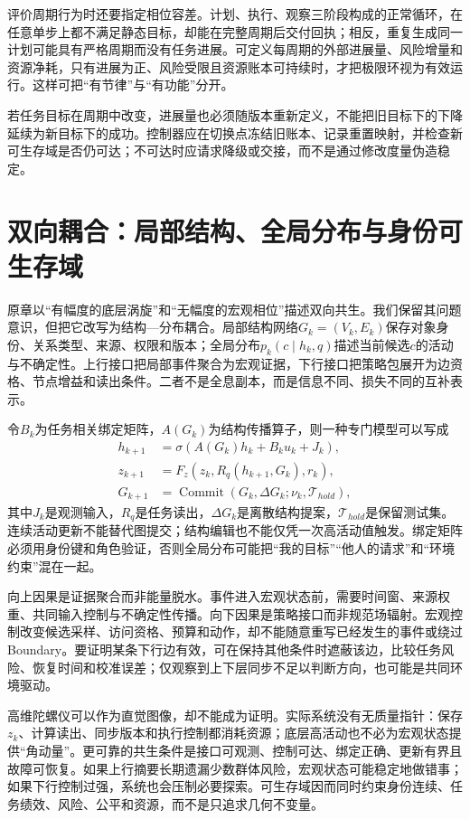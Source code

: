 评价周期行为时还要指定相位容差。计划、执行、观察三阶段构成的正常循环，在任意单步上都不满足静态目标，却能在完整周期后交付回执；相反，重复生成同一计划可能具有严格周期而没有任务进展。可定义每周期的外部进展量、风险增量和资源净耗，只有进展为正、风险受限且资源账本可持续时，才把极限环视为有效运行。这样可把“有节律”与“有功能”分开。

若任务目标在周期中改变，进展量也必须随版本重新定义，不能把旧目标下的下降延续为新目标下的成功。控制器应在切换点冻结旧账本、记录重置映射，并检查新可生存域是否仍可达；不可达时应请求降级或交接，而不是通过修改度量伪造稳定。

\section{双向耦合：局部结构、全局分布与身份可生存域}
\label{sec:dual_vortex_holographic_symbiosis}

原章以“有幅度的底层涡旋”和“无幅度的宏观相位”描述双向共生。我们保留其问题意识，但把它改写为结构—分布耦合。局部结构网络$G_k=(V_k,E_k)$保存对象身份、关系类型、来源、权限和版本；全局分布$p_k(c\mid h_k,q)$描述当前候选$c$的活动与不确定性。上行接口把局部事件聚合为宏观证据，下行接口把策略包展开为边资格、节点增益和读出条件。二者不是全息副本，而是信息不同、损失不同的互补表示。

令$B_k$为任务相关绑定矩阵，$A(G_k)$为结构传播算子，则一种专门模型可以写成
\begin{align}
h_{k+1}&=\sigma\!\left(A(G_k)h_k+B_ku_k+J_k\right),\\
z_{k+1}&=F_z\!\left(z_k,R_q(h_{k+1},G_k),r_k\right),\\
G_{k+1}&=\operatorname{Commit}\!\left(G_k,\Delta G_k;\nu_k,\mathcal{T}_{hold}\right),
\end{align}
其中$J_k$是观测输入，$R_q$是任务读出，$\Delta G_k$是离散结构提案，$\mathcal{T}_{hold}$是保留测试集。连续活动更新不能替代图提交；结构编辑也不能仅凭一次高活动值触发。绑定矩阵必须用身份键和角色验证，否则全局分布可能把“我的目标”“他人的请求”和“环境约束”混在一起。

向上因果是证据聚合而非能量脱水。事件进入宏观状态前，需要时间窗、来源权重、共同输入控制与不确定性传播。向下因果是策略接口而非规范场辐射。宏观控制改变候选采样、访问资格、预算和动作，却不能随意重写已经发生的事件或绕过Boundary。要证明某条下行边有效，可在保持其他条件时遮蔽该边，比较任务风险、恢复时间和校准误差；仅观察到上下层同步不足以判断方向，也可能是共同环境驱动。

高维陀螺仪可以作为直觉图像，却不能成为证明。实际系统没有无质量指针：保存$z_k$、计算读出、同步版本和执行控制都消耗资源；底层高活动也不必为宏观状态提供“角动量”。更可靠的共生条件是接口可观测、控制可达、绑定正确、更新有界且故障可恢复。如果上行摘要长期遗漏少数群体风险，宏观状态可能稳定地做错事；如果下行控制过强，系统也会压制必要探索。可生存域因而同时约束身份连续、任务绩效、风险、公平和资源，而不是只追求几何不变量。

